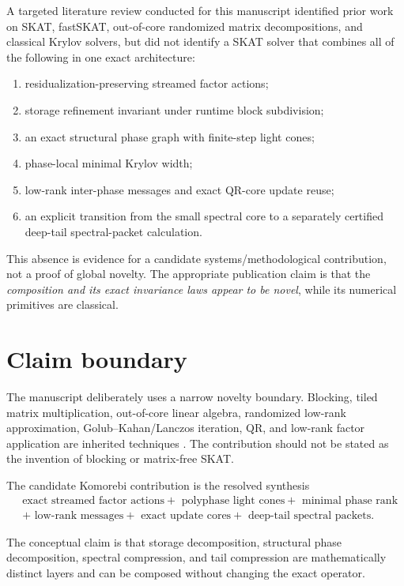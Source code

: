 \documentclass[11pt]{article}
\theoremstyle{definition}
\theoremstyle{remark}
\begin{document}
A targeted literature review conducted for this manuscript identified prior
work on SKAT, fastSKAT, out-of-core randomized matrix decompositions, and
classical Krylov solvers, but did not identify a SKAT solver that combines all
of the following in one exact architecture:
\begin{enumerate}
\item residualization-preserving streamed factor actions;
\item storage refinement invariant under runtime block subdivision;
\item an exact structural phase graph with finite-step light cones;
\item phase-local minimal Krylov width;
\item low-rank inter-phase messages and exact QR-core update reuse;
\item an explicit transition from the small spectral core to a separately
certified deep-tail spectral-packet calculation.
\end{enumerate}
This absence is evidence for a candidate systems/methodological contribution,
not a proof of global novelty.  The appropriate publication claim is that the
\emph{composition and its exact invariance laws appear to be novel}, while
its numerical primitives are classical.

\section{Claim boundary}

The manuscript deliberately uses a narrow novelty boundary. Blocking, tiled matrix multiplication, out-of-core linear algebra, randomized low-rank approximation, Golub--Kahan/Lanczos iteration, QR, and low-rank factor application are inherited techniques \cite{Halko2011,Lumley2018}. The contribution should not be stated as the invention of blocking or matrix-free SKAT.

The candidate Komorebi contribution is the resolved synthesis
\[
\boxed{\begin{aligned}
&\text{exact streamed factor actions}
+\text{ polyphase light cones}
+\text{ minimal phase rank}\\
&+\text{ low-rank messages}
+\text{ exact update cores}
+\text{ deep-tail spectral packets}.
\end{aligned}}
\]

The conceptual claim is that storage decomposition, structural phase
decomposition, spectral compression, and tail compression are mathematically
distinct layers and can be composed without changing the exact operator.
\end{document}
